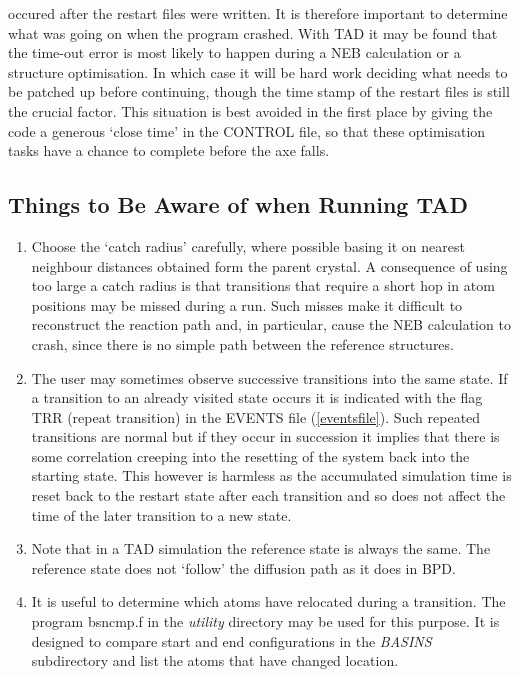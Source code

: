 \begin{enumerate}
\begin{enumerate}
  occured after the restart files were written. It is therefore
  important to determine what was going on when the program
  crashed. With TAD it may be found that the time-out error is most
  likely to happen during a NEB calculation or a structure
  optimisation. In which case it will be hard work deciding what needs
  to be patched up before continuing, though the time stamp of the
  restart files is still the crucial factor. This situation is best
  avoided in the first place by giving the code a generous `close
  time' in the CONTROL file, so that these optimisation tasks have a
  chance to complete before the axe falls.
\end{enumerate}
\end{enumerate}

\subsection{Things to Be Aware of when Running  TAD}

\begin{enumerate}
\item Choose the `catch radius' carefully, where possible basing it on
  nearest neighbour distances obtained form the parent crystal. A
  consequence of using too large a catch radius is that transitions
  that require a short hop in atom positions may be missed during a
  run. Such misses make it difficult to reconstruct the reaction path
  and, in particular, cause the NEB calculation to crash, since there
  is no simple path between the reference structures.
\item The user may sometimes observe successive transitions into the same 
  state. If a transition to an already visited state occurs it is
  indicated with the flag TRR (repeat transition) in the EVENTS
  file (\ref{eventsfile}). Such repeated transitions are normal but if they occur in
  succession it implies that there is some correlation creeping into
  the resetting of the system back into the starting state. This
  however is harmless as the accumulated simulation time is reset back
  to the restart state after each transition and so does not affect
  the time of the later transition to a new state.
\item Note that in a TAD simulation the reference state is always 
  the same. The reference state does not `follow' the diffusion path as
  it does in BPD.
\item It is useful to determine which atoms have relocated during a
  transition. The program bsncmp.f in the {\em  utility} directory 
  may be used for this purpose. It is designed to compare start and 
  end configurations in the {\em BASINS} subdirectory and list the 
  atoms that have changed location.
\end{enumerate}

